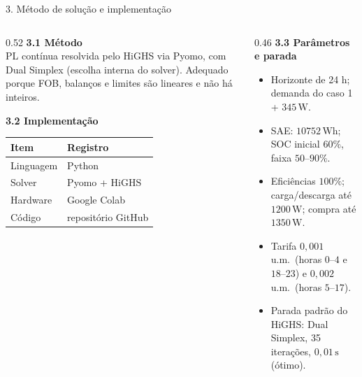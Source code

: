 \documentclass[aspectratio=169,11pt]{beamer}
\begin{document}
\begin{frame}{3. Método de solução e implementação}
\begin{columns}[T]
\begin{column}{0.52\textwidth}
\textbf{3.1 Método}\\[0.3em]
{\small
PL contínua resolvida pelo HiGHS via Pyomo, com Dual Simplex (escolha interna do solver). Adequado porque FOB, balanços e limites são lineares e não há inteiros.
}
\vspace{0.7em}

\textbf{3.2 Implementação}\\[0.25em]
{\small
\begin{tabular}{@{}ll@{}}
\toprule
Item & Registro \\
\midrule
Linguagem & Python \\
Solver & Pyomo + HiGHS \\
Hardware & Google Colab \\
Código & repositório GitHub \\
\bottomrule
\end{tabular}
}
\end{column}
\begin{column}{0.46\textwidth}
\textbf{3.3 Parâmetros e parada}\\[0.3em]
{\small
\begin{itemize}\setlength{\itemsep}{0.28em}
  \item Horizonte de 24 h; demanda do caso 1 + $345\,\mathrm{W}$.
  \item SAE: $10752\,\mathrm{Wh}$; SOC inicial $60\%$, faixa $50$--$90\%$.
  \item Eficiências $100\%$; carga/descarga até $1200\,\mathrm{W}$; compra até $1350\,\mathrm{W}$.
  \item Tarifa $0{,}001$ u.m.\ (horas $0$--$4$ e $18$--$23$) e $0{,}002$ u.m.\ (horas $5$--$17$).
  \item Parada padrão do HiGHS: Dual Simplex, 35 iterações, $0{,}01\,\mathrm{s}$ (ótimo).
\end{itemize}
}
\end{column}
\end{columns}
\end{frame}
\end{document}
